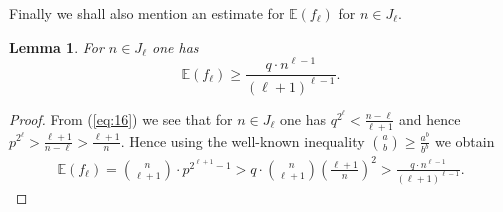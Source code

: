 \documentclass[11pt,twoside, reqno]{amsart}
\theoremstyle{plain}
\newtheorem{lema}{Lemma}
\theoremstyle{definition}
\newcommand{\E}{\mathbb{E}}
\begin{document}


Finally we shall also mention an estimate for $\E(f_\ell)$ for $n\in J_\ell$. 
\begin{lema}
For $n\in J_\ell$ one has 
$$\E(f_\ell)\ge  \frac{q \cdot n^{\ell-1}}{(\ell+1)^{\ell-1}}.$$
\end{lema}
\begin{proof}
From (\ref{eq:16}) we see that for $n\in J_\ell$ one has $q^{2^{\ell}}<\frac{n-\ell}{\ell+1}$ and hence $p^{2^{\ell}}>\frac{\ell+1}{n-\ell}>\frac{\ell+1}{n}$. Hence using the well-known inequality $\binom a b \ge \frac{a^b}{b^b}$ we obtain
\begin{eqnarray*}\label{ineq:29}
\E(f_\ell) =\binom n {\ell+1} \cdot p^{2^{\ell+1}-1} > q \cdot \binom n {\ell+1}\left(\frac{\ell+1}{n}\right)^2>   \frac{q \cdot n^{\ell-1}}{(\ell+1)^{\ell-1}}. 
\end{eqnarray*}
\end{proof}




\end{document}

